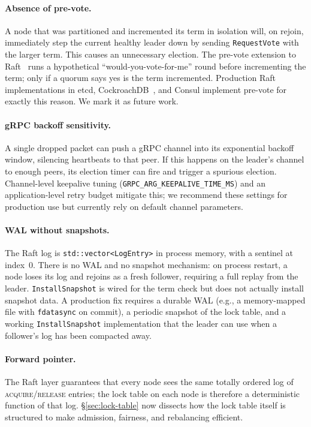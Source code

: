 \documentclass[sigconf]{acmart}
\begin{document}
\paragraph{\textbf{Absence of pre-vote.}} A node that was partitioned and
incremented its term in isolation will, on rejoin, immediately step the
current healthy leader down by sending \texttt{RequestVote} with the
larger term. This causes an unnecessary election. The pre-vote
extension to Raft~\cite{raft-thesis} runs a hypothetical
``would-you-vote-for-me'' round before incrementing the term; only if a
quorum says yes is the term incremented. Production Raft implementations
in etcd, CockroachDB~\cite{cockroachdb}, and Consul implement
pre-vote for exactly this reason. We mark it as future work.

\paragraph{\textbf{gRPC backoff sensitivity.}} A single dropped packet can push a
gRPC channel into its exponential backoff window, silencing heartbeats
to that peer. If this happens on the leader's channel to enough peers,
its election timer can fire and trigger a spurious election. Channel-level
keepalive tuning (\texttt{GRPC\_ARG\_KEEPALIVE\_TIME\_MS}) and an
application-level retry budget mitigate this; we recommend these settings
for production use but currently rely on default channel parameters.

\paragraph{WAL without snapshots.} The Raft log is
\texttt{std::vector<LogEntry>} in process memory, with a sentinel at
index~0. There is no WAL and no snapshot mechanism: on process restart, a
node loses its log and rejoins as a fresh follower, requiring a full
replay from the leader. \texttt{InstallSnapshot} is wired for the term
check but does not actually install snapshot data. A production fix
requires a durable WAL (e.g., a memory-mapped file with \texttt{fdatasync}
on commit), a periodic snapshot of the lock table, and a working
\texttt{InstallSnapshot} implementation that the leader can use when a
follower's log has been compacted away.

\paragraph{\textbf{Forward pointer.}}
The Raft layer guarantees that every node sees the same totally ordered
log of \textsc{acquire}/\textsc{release} entries; the lock table on each
node is therefore a deterministic function of that log.
\S\ref{sec:lock-table} now dissects how the lock table itself is
structured to make admission, fairness, and rebalancing efficient.
\end{document}

